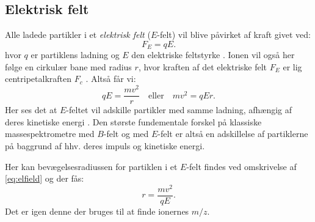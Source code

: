 \subsection{Elektrisk felt}\label{subsec:e-felt}
Alle ladede partikler i et \emph{elektrisk felt} ($E$-felt) vil blive påvirket af kraft givet ved:
\begin{equation}
	F_E = qE.
\end{equation}
hvor $q$ er partiklens ladning og $E$ den elektriske feltstyrke \parencite{orbitAstx}.
Ionen vil også her følge en cirkulær bane med radius $r$, hvor kraften af det elektriske felt $F_E$ er lig centripetalkraften $F_c$ \parencite{mstextbook}. Altså får vi:
\begin{equation}\label{eq:elfield}
	qE = \frac{mv^2}{r}\quad\text{eller}\quad mv^2 = qEr.
\end{equation}
Her ses det at $E$-feltet vil adskille partikler med samme ladning, afhængig af deres kinetiske energi \parencite{massspec}.
Den største fundementale forskel på klassiske massespektrometre med $B$-felt og med $E$-felt er altså en adskillelse af partiklerne på baggrund af hhv. deres impuls og kinetiske energi.
\par Her kan bevægelsesradiussen for partiklen i et $E$-felt findes ved omskrivelse af \cref{eq:elfield} og der fås:
\begin{equation}
	r = \frac{mv^2}{qE}.
\end{equation}
Det er igen denne der bruges til at finde ionernes $m/z$.
